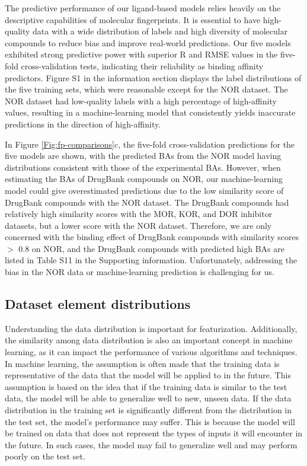 \documentclass[10pt]{article}
\begin{document}
		The predictive performance of our ligand-based models relies heavily on the descriptive capabilities of molecular fingerprints. It is essential to have high-quality data with a wide distribution of labels and high diversity of molecular compounds to reduce bias and improve real-world predictions. Our five models exhibited strong predictive power with superior R and RMSE values in the five-fold cross-validation tests, indicating their reliability as binding affinity predictors. Figure S1 in the information section displays the label distributions of the five training sets, which were reasonable except for the NOR dataset. The NOR dataset had low-quality labels with a high percentage of high-affinity values, resulting in a machine-learning model that consistently yields inaccurate predictions in the direction of high-affinity.
		
		In Figure \ref{Fig:fp-comparisons}c, the five-fold cross-validation predictions for the five models are shown, with the predicted BAs from the NOR model having distributions consistent with those of the experimental BAs. However, when estimating the BAs of DrugBank compounds on NOR, our machine-learning model could give overestimated predictions due to the low similarity score of DrugBank compounds with the NOR dataset. The DrugBank compounds had relatively high similarity scores with the MOR, KOR, and DOR inhibitor datasets, but a lower score with the NOR dataset. Therefore, we are only concerned with the binding effect of DrugBank compounds with similarity scores $>$ 0.8 on NOR, and the DrugBank compounds with predicted high BAs are listed in Table S11 in the Supporting information. Unfortunately, addressing the bias in the NOR data or machine-learning prediction is challenging for us.
		
		
		\subsection{Dataset element distributions}		
		
Understanding the data distribution is important for featurization. Additionally, the similarity among data distribution is also an important concept in machine learning, as it can impact the performance of various algorithms and techniques. In machine learning, the assumption is often made that the training data is representative of the data that the model will be applied to in the future. This assumption is based on the idea that if the training data is similar to the test data, the model will be able to generalize well to new, unseen data. If the data distribution in the training set is significantly different from the distribution in the test set, the model's performance may suffer. This is because the model will be trained on data that does not represent the types of inputs it will encounter in the future. In such cases, the model may fail to generalize well and may perform poorly on the test set.
\end{document}
